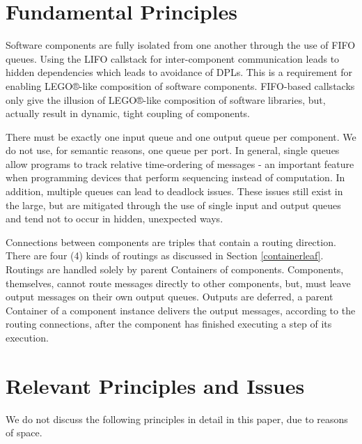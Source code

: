 \documentclass[10pt,anonymous,review]{acmart}
\begin{document}
\section{Fundamental Principles}
Software components are fully isolated from one another through the use
of FIFO queues. Using the LIFO callstack for inter-component
communication leads to hidden dependencies which leads to avoidance of
DPLs. This is a requirement for enabling LEGO®-like composition of software components.
FIFO-based callstacks only give the illusion of LEGO®-like composition of software libraries,
but, actually result in dynamic, tight coupling of components.

There must be exactly one input queue and one output queue per component. We
do not use, for semantic reasons, one queue per port. In general, single
queues allow programs to track relative time-ordering of messages - an
important feature when programming devices that perform sequencing
instead of computation. In addition, multiple queues can lead to
deadlock issues. These issues still exist in the large, but are
mitigated through the use of single input and output queues and tend not
to occur in hidden, unexpected ways.

Connections between components are triples that contain a routing direction.
There are four (4) kinds of routings as discussed in Section \ref{containerleaf}.
Routings are handled solely by parent Containers of components. Components, themselves, cannot route messages directly to other components, but, must leave output messages on their own output queues. Outputs are deferred, a parent Container of a component instance delivers the output messages, according to the routing connections, after the component has finished executing a step of its execution.


\section{Relevant Principles and Issues}
We do not discuss the following principles in detail in this paper, due
to reasons of space.
\end{document}
